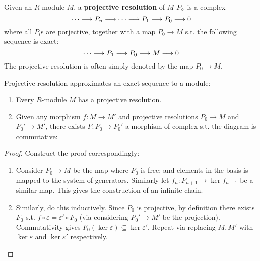 \documentclass{article}
\begin{document}
\begin{definition}
    Given an $R$-module $M$, a \textbf{projective resolution} of $M$ $P_{\circ}$ is a complex
    \[
        \cdots \longrightarrow P_n \longrightarrow \cdots \longrightarrow P_1 \longrightarrow P_0 \longrightarrow 0
    \]
    where all $P_i$s are porjective, together with a map $P_0 \to M$ s.t. the following sequence is exact:
    \[
        \cdots \longrightarrow P_1 \longrightarrow P_0 \longrightarrow M \longrightarrow 0
    \]
    The projective resolution is often simply denoted by the map $P_0 \to M$.
\end{definition}

\begin{proposition}
    Projective resolution approximates an exact sequence to a module:
    \begin{enumerate}[label=\roman*)]
        \item Every $R$-module $M$ has a projective resolution.
        \item Given any morphism $f: M \to M'$ and projective resolutions $P_0 \to M$ and $P_0' \to M'$, there exists $F: P_0 \to P_0'$ a morphism of complex s.t. the diagram is commutative:
        \begin{figure}[htbp]
            \centering
        \end{figure}
    \end{enumerate}
\end{proposition}

\begin{proof}
    Construct the proof correspondingly:
    \begin{enumerate}[label=\roman*)]
        \item Consider $P_0 \to M$ be the map where $P_0$ is free; and elements in the basis is mapped to the system of generators. Similarly let $f_n: P_{n+1} \to \ker f_{n-1}$ be a similar map. This gives the construction of an infinite chain.
        \item Similarly, do this inductively. Since $P_0$ is projective, by definition there exists $F_0$ s.t. $f \circ \varepsilon = \varepsilon' \circ F_0$ (via considering $P_0' \to M'$ be the projection). Commutativity gives $F_0(\ker \varepsilon) \subseteq \ker \varepsilon'$. Repeat via replacing $M, M'$ with $\ker \varepsilon$ and $\ker \varepsilon'$ respectively. 
    \end{enumerate}
\end{proof}
\end{document}

